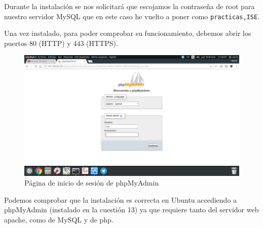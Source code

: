 \begin{flushleft}
Durante la instalación se nos solicitará que escojamos la contraseña de root para nuestro servidor MySQL que en este caso he vuelto a poner como \verb|practicas,ISE|. \linebreak

Una vez instalado, para poder comprobar su funcionamiento, debemos abrir los puertos 80 (HTTP) y 443 (HTTPS).

\begin{figure}[H]
	\centering
	\includegraphics[scale=0.3]{phpmyadmin1.png}
	\caption{Página de inicio de sesión de phpMyAdmin}
	\label{fig:phpmyadmin}
\end{figure}

Podemos comprobar que la instalación es correcta en Ubuntu accediendo a phpMyAdmin (instalado en la cuestión 13) ya que requiere tanto del servidor web apache, como de MySQL y de php.\linebreak


\end{flushleft}
